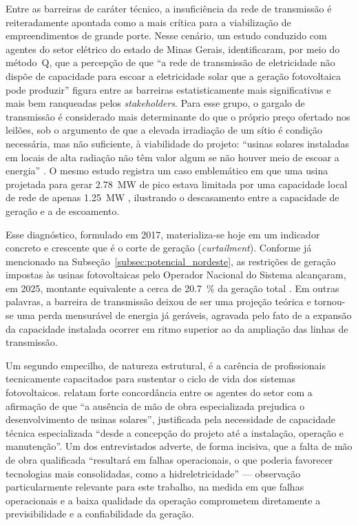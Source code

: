 Entre as barreiras de caráter técnico, a insuficiência da rede de transmissão é
reiteradamente apontada como a mais crítica para a viabilização de
empreendimentos de grande porte. Nesse cenário, um estudo conduzido com agentes do setor
elétrico do estado de Minas Gerais,  identificaram, por
meio do método~Q, que a percepção de que ``a rede de transmissão de eletricidade
não dispõe de capacidade para escoar a eletricidade solar que a geração
fotovoltaica pode produzir'' figura entre as barreiras estatisticamente mais
significativas e mais bem ranqueadas pelos \emph{stakeholders}. Para esse grupo,
o gargalo de transmissão é considerado mais determinante do que o próprio preço
ofertado nos leilões, sob o argumento de que a elevada irradiação de um sítio é
condição necessária, mas não suficiente, à viabilidade do projeto: ``usinas
solares instaladas em locais de alta radiação não têm valor algum se não houver
meio de escoar a energia'' \cite{Fratea2017}. O mesmo estudo registra um caso
emblemático em que uma usina projetada para gerar \SI{2,78}{\mega\watt} de pico
estava limitada por uma capacidade local de rede de apenas \SI{1,25}{\mega\watt}
\cite{Fratea2017}, ilustrando o descasamento entre a capacidade de geração e a de
escoamento.

Esse diagnóstico, formulado em 2017, materializa-se hoje em um indicador
concreto e crescente que é o corte de geração (\textit{curtailment}). Conforme já
mencionado na Subseção~\ref{subsec:potencial_nordeste}, as restrições de geração
impostas às usinas fotovoltaicas pelo Operador Nacional do Sistema alcançaram,
em 2025, montante equivalente a cerca de \SI{20,7}{\percent} da geração total
\cite{absolar2026infografico}. Em outras palavras, a barreira de transmissão
deixou de ser uma projeção teórica e tornou-se uma perda mensurável de energia
já geráveis, agravada pelo fato de a expansão da capacidade instalada ocorrer em
ritmo superior ao da ampliação das linhas de transmissão.

Um segundo empecilho, de natureza estrutural, é a carência de profissionais
tecnicamente capacitados para sustentar o ciclo de vida dos sistemas
fotovoltaicos.  relatam forte concordância entre os
agentes do setor com a afirmação de que ``a ausência de mão de obra
especializada prejudica o desenvolvimento de usinas solares'', justificada pela
necessidade de capacidade técnica especializada ``desde a concepção do projeto
até a instalação, operação e manutenção''. Um dos entrevistados adverte, de
forma incisiva, que a falta de mão de obra qualificada ``resultará em falhas
operacionais, o que poderia favorecer tecnologias mais consolidadas, como a
hidreletricidade'' \cite{Fratea2017} --- observação particularmente relevante
para este trabalho, na medida em que falhas operacionais e a baixa qualidade
da operação comprometem diretamente a previsibilidade e a confiabilidade da
geração.

